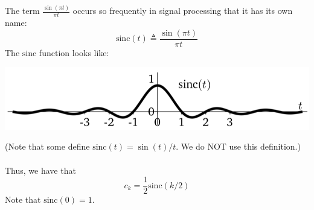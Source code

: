 \documentclass[10pt]{article}
\begin{document}
The term $\frac{\sin(\pi t)}{\pi t}$ occurs so frequently in signal processing that it has its own name:
\newcommand{\sinc}{\text{sinc}}
\[\sinc(t) \triangleq \frac{\sin(\pi t)}{\pi t}\]
The $\sinc$ function looks like:
\begin{center}
    \includegraphics[scale=0.7]{W4_8.png}
\end{center}
(Note that some define $\sinc(t) = \sin(t) / t$.  We do NOT use this definition.)\\\\
Thus, we have that
\[c_k = \frac{1}{2} \sinc(k / 2)\]
Note that $\sinc(0) = 1$.

\pagebreak
\end{document}
